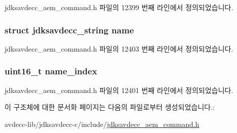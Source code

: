 jdksavdecc\+\_\+aem\+\_\+command.\+h 파일의 12399 번째 라인에서 정의되었습니다.

\subsubsection[{\texorpdfstring{name}{name}}]{\setlength{\rightskip}{0pt plus 5cm}struct {\bf jdksavdecc\+\_\+string} name}\hypertarget{structjdksavdecc__aem__command__set__name_a7e615b51b7768e9b59bfa450051e0f8e}{}\label{structjdksavdecc__aem__command__set__name_a7e615b51b7768e9b59bfa450051e0f8e}


jdksavdecc\+\_\+aem\+\_\+command.\+h 파일의 12403 번째 라인에서 정의되었습니다.

\subsubsection[{\texorpdfstring{name\+\_\+index}{name_index}}]{\setlength{\rightskip}{0pt plus 5cm}uint16\+\_\+t name\+\_\+index}\hypertarget{structjdksavdecc__aem__command__set__name_a898a74ada625e0b227dadb02901404e6}{}\label{structjdksavdecc__aem__command__set__name_a898a74ada625e0b227dadb02901404e6}


jdksavdecc\+\_\+aem\+\_\+command.\+h 파일의 12401 번째 라인에서 정의되었습니다.



이 구조체에 대한 문서화 페이지는 다음의 파일로부터 생성되었습니다.\+:\begin{DoxyCompactItemize}
\item 
avdecc-\/lib/jdksavdecc-\/c/include/\hyperlink{jdksavdecc__aem__command_8h}{jdksavdecc\+\_\+aem\+\_\+command.\+h}\end{DoxyCompactItemize}

